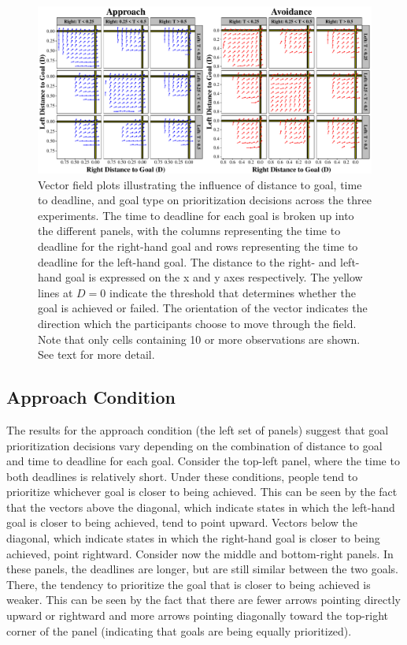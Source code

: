 \documentclass[a4paper,doc,natbib,donotrepeattitle]{apa6}
\begin{document}

\begin{figure}[h!]
\centering
\includegraphics[width=1\textwidth]{descriptive_gradient.pdf}
\caption{\label{fig:descriptives} Vector field plots illustrating the influence of distance to goal, time to deadline, and goal type on prioritization decisions across the three experiments. The time to deadline for each goal is broken up into the different panels, with the columns representing the time to deadline for the right-hand goal and rows representing the time to deadline for the left-hand goal. The distance to the right- and left-hand goal is expressed on the x and y axes respectively. The yellow lines at $D = 0$ indicate the threshold that determines whether the goal is achieved or failed. The orientation of the vector indicates the direction which the participants choose to move through the field. Note that only cells containing 10 or more observations are shown. See text for more detail.}
\end{figure}

\subsection{Approach Condition}
The results for the approach condition (the left set of panels) suggest that goal prioritization decisions vary depending on the combination of distance to goal and time to deadline for each goal. Consider the top-left panel, where the time to both deadlines is relatively short. Under these conditions, people tend to prioritize whichever goal is closer to being achieved. This can be seen by the fact that the vectors above the diagonal, which indicate states in which the left-hand goal is closer to being achieved, tend to point upward. Vectors below the diagonal, which indicate states in which the right-hand goal is closer to being achieved, point rightward. Consider now the middle and bottom-right panels. In these panels, the deadlines are longer, but are still similar between the two goals. There, the tendency to prioritize the goal that is closer to being achieved is weaker. This can be seen by the fact that there are fewer arrows pointing directly upward or rightward and more arrows pointing diagonally toward the top-right corner of the panel (indicating that goals are being equally prioritized).
\end{document}
